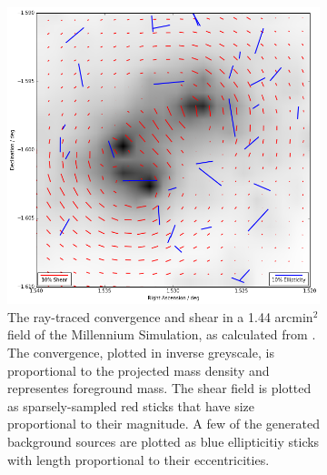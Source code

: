 \documentclass[%
 reprint,
 amsmath,amssymb,
 aps,nofootinbib
]{revtex4-1}
\begin{document}
\begin{figure}
    \centering
    \begin{subfigure}[H]{0.45\textwidth}
        \includegraphics[width=\textwidth]{figs-swe/thesis/field2.png}
        \captionsetup{justification=raggedright,singlelinecheck=false}
        \caption{The ray-traced convergence and shear in a 1.44 arcmin$^2$ field of the Millennium Simulation, as calculated from \cite{ray_tracing}. The convergence, plotted in inverse greyscale, is proportional to the projected mass density and representes foreground mass. The shear field is plotted as sparsely-sampled red sticks that have size proportional to their magnitude. A few of the generated background sources are plotted as blue ellipticitiy sticks with length proportional to their eccentricities.}
        \label{fig:field2}
    \end{subfigure}
     ~
    \begin{subfigure}[H]{0.45\textwidth}

\end{subfigure}
\end{figure}
\end{document}
